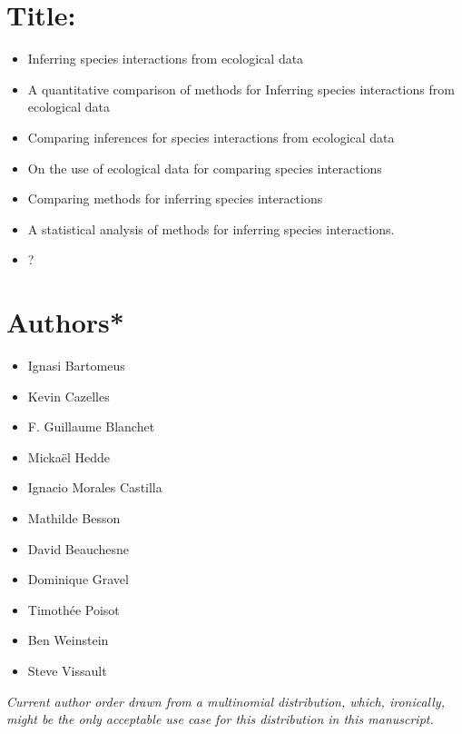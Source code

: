 


\linenumbers
\modulolinenumbers[1]

\doublespacing

\section{Title:}\label{title}

\begin{itemize}
  \item Inferring species interactions from ecological data
  \item A quantitative comparison of methods for Inferring species interactions
  from ecological data
\item Comparing inferences for species interactions from ecological data
\item On the use of ecological data for comparing species interactions
\item Comparing methods for inferring species interactions
\item A statistical analysis of methods for inferring species interactions.
\item ?
\end{itemize}

\section{Authors*}\label{authors}

\begin{itemize}
  \item Ignasi Bartomeus
  \item Kevin Cazelles
  \item F. Guillaume Blanchet
  \item Mickaël Hedde
  \item Ignacio Morales Castilla
  \item Mathilde Besson
  \item David Beauchesne
  \item Dominique Gravel
  \item Timothée Poisot
  \item Ben Weinstein
  \item Steve Vissault
\end{itemize}

\emph{Current author order drawn from a multinomial distribution, which,
ironically, might be the only acceptable use case for this distribution in this
manuscript.}

